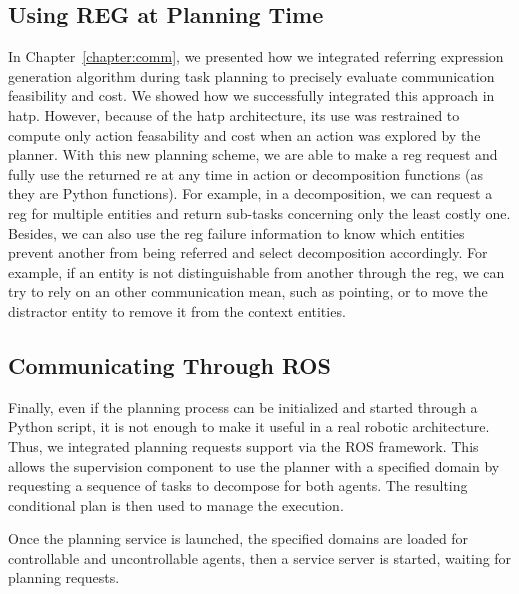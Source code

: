 \documentclass[a4paper,11pt,twoside]{StyleThese}
\begin{document}
\subsection{Using REG at Planning Time}
In Chapter~\ref{chapter:comm}, we presented how we integrated referring expression generation algorithm during task planning to precisely evaluate communication feasibility and cost. We showed how we successfully integrated this approach in \acrshort{hatp}. However, because of the \acrshort{hatp} architecture, its use was restrained to compute only action feasability and cost when an action was explored by the planner.
With this new planning scheme, we are able to make a \acrshort{reg} request and fully use the returned \acrshort{re} at any time in action or decomposition functions (as they are Python functions). For example, in a decomposition, we can request a \acrshort{reg} for multiple entities and return sub-tasks concerning only the least costly one. 
Besides, we can also use the \acrshort{reg} failure information to know which entities prevent another from being referred and select decomposition accordingly. For example, if an entity is not distinguishable from another through the \acrshort{reg}, we can try to rely on an other communication mean, such as pointing, or to move the distractor entity to remove it from the context entities.

\subsection{Communicating Through ROS}
Finally, even if the planning process can be initialized and started through a Python script, it is not enough to make it useful in a real robotic architecture. Thus, we integrated planning requests support via the ROS framework. This allows the supervision component to use the planner with a specified domain by requesting a sequence of tasks to decompose for both agents. The resulting conditional plan is then used to manage the execution.

Once the planning service is launched, the specified domains are loaded for controllable and uncontrollable agents, then a service server is started, waiting for planning requests. 
\end{document}

